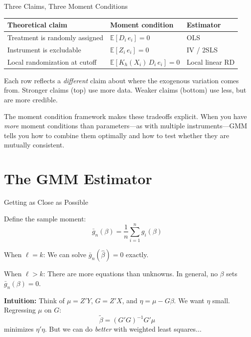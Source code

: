 \documentclass[aspectratio=169, handout, t]{beamer}
\numberwithin{equation}{section}
\begin{document}
\begin{frame}{Three Claims, Three Moment Conditions}

\renewcommand{\arraystretch}{1.6}
\begin{tabular}{lll}
\toprule
\textbf{Theoretical claim} & \textbf{Moment condition} & \textbf{Estimator} \\
\midrule
Treatment is randomly assigned & $\mathbb{E}[D_i \, e_i] = 0$ & OLS \\
Instrument is excludable & $\mathbb{E}[Z_i \, e_i] = 0$ & IV / 2SLS \\
Local randomization at cutoff & $\mathbb{E}[K_h(X_i) \, D_i \, e_i] = 0$ & Local linear RD \\
\bottomrule
\end{tabular}
\renewcommand{\arraystretch}{1.0}

\medskip\pause
Each row reflects a \emph{different} claim about where the exogenous variation comes from.  Stronger claims (top) use more data.  Weaker claims (bottom) use less, but are more credible.

\medskip\pause
The moment condition framework makes these tradeoffs explicit.  When you have \emph{more} moment conditions than parameters---as with multiple instruments---GMM tells you how to combine them optimally and how to test whether they are mutually consistent.

\end{frame}

\section{The GMM Estimator}

\begin{frame}{Getting as Close as Possible}

Define the sample moment:
$$\bar{g}_n(\beta) = \frac{1}{n}\sum_{i=1}^n g_i(\beta)$$

\smallskip
When $\ell = k$: We can solve $\bar{g}_n(\hat\beta) = 0$ exactly.

\smallskip
When $\ell > k$: There are \alert{more equations than unknowns}. In general, no $\beta$ sets $\bar{g}_n(\beta) = 0$.

\medskip
\textbf{Intuition:} Think of $\mu = Z'Y$, $G = Z'X$, and $\eta = \mu - G\beta$. We want $\eta$ small. Regressing $\mu$ on $G$:
$$\tilde\beta = (G'G)^{-1}G'\mu$$
minimizes $\eta'\eta$. But we can do \textit{better} with weighted least squares...

\end{frame}
\end{document}
